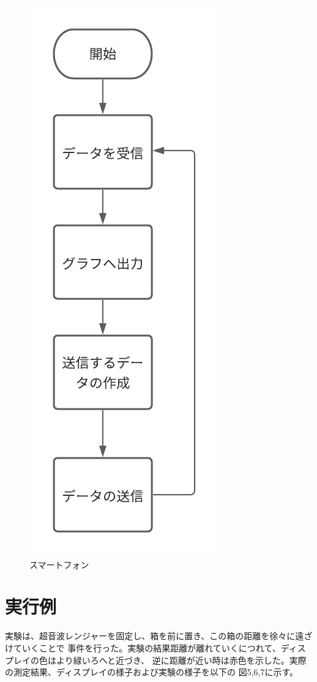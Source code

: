 \documentclass[dvipdfmx,autodetect-engine,titlepage]{jsarticle}
\begin{document}
\begin{figure}[h]
\begin{minipage}[b]{0.45\linewidth}
\begin{center}
      \includegraphics[keepaspectratio,scale=0.5]{フローチャート2.png}
      \end{center}
      \caption{スマートフォン}
    \end{minipage}
  \end{figure}


\section{実行例}
実験は、超音波レンジャーを固定し、箱を前に置き、この箱の距離を徐々に遠ざけていくことで
事件を行った。実験の結果距離が離れていくにつれて、ディスプレイの色はより緑いろへと近づき、
逆に距離が近い時は赤色を示した。実際の測定結果、ディスプレイの様子および実験の様子を以下の
図5,6,7に示す。
\end{document}
